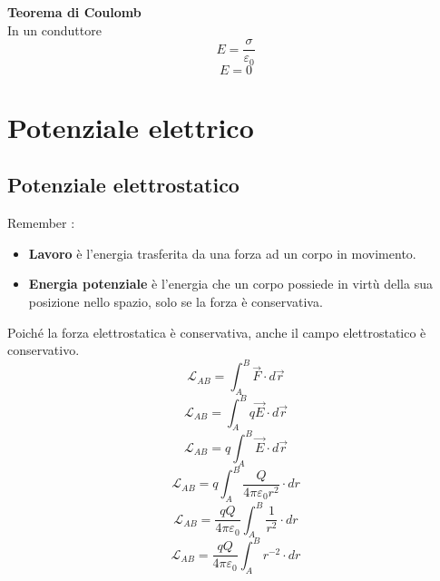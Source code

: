 \documentclass[twoside]{article}
\begin{document}
\textbf{Teorema di Coulomb}\\
In un conduttore
\begin{equation}
    \boxed{E = \displaystyle \frac{\sigma}{\varepsilon_0}}
\end{equation}
\begin{equation}
    \boxed{E = 0}
\end{equation}

\newpage
\section{Potenziale elettrico}
\subsection{Potenziale elettrostatico}
Remember :
\begin{itemize}
    \item \textbf{Lavoro} è l'energia trasferita da una forza ad un corpo in movimento.
    \item \textbf{Energia potenziale} è l'energia che un corpo possiede in virtù della sua posizione nello spazio, solo se la forza è conservativa.
\end{itemize}
Poiché la forza elettrostatica è conservativa, anche il campo elettrostatico è conservativo.\\
\begin{equation*}
    \mathcal{L}_{AB} = \displaystyle \int_{A}^{B} \vec{F} \cdot d\vec{r}
\end{equation*}
\begin{equation*}
    \mathcal{L}_{AB} = \displaystyle \int_{A}^{B} q \vec{E} \cdot d\vec{r}
\end{equation*}
\begin{equation*}
    \mathcal{L}_{AB} = q \displaystyle \int_{A}^{B} \vec{E} \cdot d\vec{r}
\end{equation*}
\begin{equation*}
    \mathcal{L}_{AB} = q \displaystyle \int_{A}^{B} \frac{Q}{4\pi \varepsilon_0 r^2} \cdot dr
\end{equation*}
\begin{equation*}
    \mathcal{L}_{AB} = \frac{qQ}{4\pi \varepsilon_0} \displaystyle \int_{A}^{B} \frac{1}{r^2} \cdot dr
\end{equation*}
\begin{equation*}
    \mathcal{L}_{AB} = \frac{qQ}{4\pi \varepsilon_0} \displaystyle \int_{A}^{B} r^{-2} \cdot dr
\end{equation*}
\end{document}
